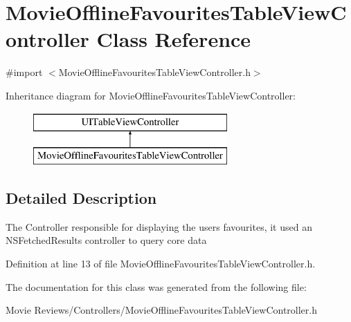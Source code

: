\section{Movie\+Offline\+Favourites\+Table\+View\+Controller Class Reference}
\label{interface_movie_offline_favourites_table_view_controller}


{\ttfamily \#import $<$Movie\+Offline\+Favourites\+Table\+View\+Controller.\+h$>$}

Inheritance diagram for Movie\+Offline\+Favourites\+Table\+View\+Controller\+:\begin{figure}[H]
\begin{center}
\leavevmode
\includegraphics[height=2.000000cm]{interface_movie_offline_favourites_table_view_controller}
\end{center}
\end{figure}


\subsection{Detailed Description}
The Controller responsible for displaying the user\textquotesingle{}s favourites, it used an N\+S\+Fetched\+Results controller to query core data 

Definition at line 13 of file Movie\+Offline\+Favourites\+Table\+View\+Controller.\+h.



The documentation for this class was generated from the following file\+:\begin{DoxyCompactItemize}
\item 
Movie Reviews/\+Controllers/Movie\+Offline\+Favourites\+Table\+View\+Controller.\+h\end{DoxyCompactItemize}
